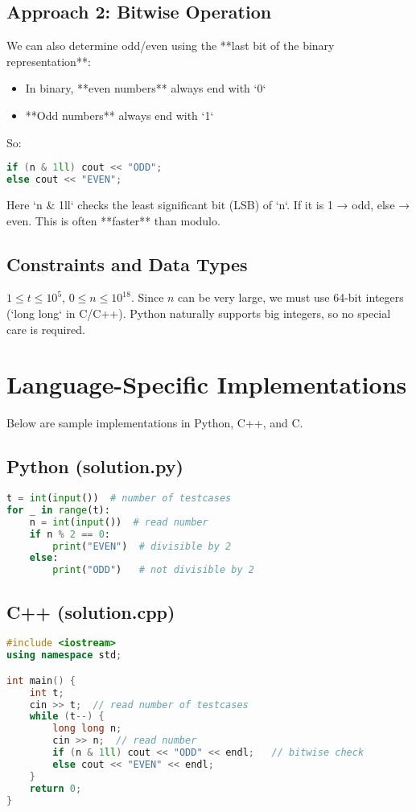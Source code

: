 \documentclass[11pt,a4paper]{article}
\begin{document}
\subsection*{Approach 2: Bitwise Operation}
We can also determine odd/even using the **last bit of the binary representation**:
\begin{itemize}
  \item In binary, **even numbers** always end with `0`
  \item **Odd numbers** always end with `1`
\end{itemize}
So:
\begin{lstlisting}[language=C++]
if (n & 1ll) cout << "ODD";
else cout << "EVEN";
\end{lstlisting}
Here `n & 1ll` checks the least significant bit (LSB) of `n`. If it is 1 → odd, else → even.
This is often **faster** than modulo.

\subsection*{Constraints and Data Types}
$1 \leq t \leq 10^5$, $0 \leq n \leq 10^{18}$.
Since $n$ can be very large, we must use 64-bit integers (`long long` in C/C++). Python naturally supports big integers, so no special care is required.

\section*{Language-Specific Implementations}
Below are sample implementations in Python, C++, and C.

\subsection*{Python (solution.py)}
\begin{lstlisting}[language=Python]
t = int(input())  # number of testcases
for _ in range(t):
    n = int(input())  # read number
    if n % 2 == 0:
        print("EVEN")  # divisible by 2
    else:
        print("ODD")   # not divisible by 2
\end{lstlisting}

\subsection*{C++ (solution.cpp)}
\begin{lstlisting}[language=C++]
#include <iostream>
using namespace std;

int main() {
    int t;
    cin >> t;  // read number of testcases
    while (t--) {
        long long n;
        cin >> n;  // read number
        if (n & 1ll) cout << "ODD" << endl;   // bitwise check
        else cout << "EVEN" << endl;
    }
    return 0;
}
\end{lstlisting}
\end{document}
